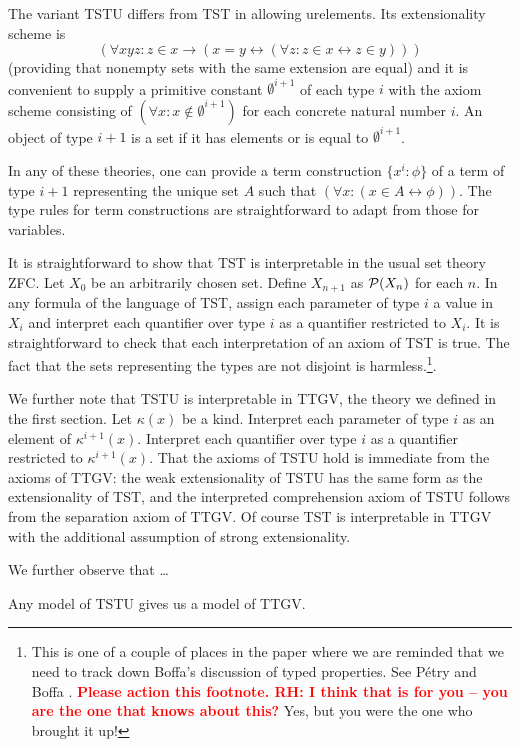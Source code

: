 \documentclass[12pt]{article}
\begin{document}
The variant TSTU differs from TST in allowing urelements.  Its extensionality scheme is $$(\forall xyz:z\in x \rightarrow(x=y \leftrightarrow (\forall z:z\in x \leftrightarrow z \in y)))$$ (providing that nonempty sets with the same extension are equal) and it is convenient to supply a primitive constant $\emptyset^{i+1}$ of each type $i$ with the axiom scheme consisting of $(\forall x:x \not\in \emptyset^{i+1})$ for each concrete natural number $i$.  An object of type $i+1$ is a set if it has elements or is equal to $\emptyset^{i+1}$.

In any of these theories, one can provide a term construction $\{x^i:\phi\}$ of a term of type $i+1$ representing the unique set $A$ such that $(\forall x:(x \in A \leftrightarrow \phi))$. The type rules for term constructions are straightforward to adapt from those for variables.

It is straightforward to show that TST is interpretable in the usual set theory ZFC.  Let $X_0$ be an arbitrarily chosen set. Define $X_{n+1}$ as ${\cal P}(X_n)$ for each $n$.  In any formula of the language of TST, assign each parameter
of type $i$ a value in $X_i$ and interpret each quantifier over type $i$ as a quantifier restricted to $X_i$.  It is straightforward to check that each interpretation of an axiom of TST is true.   The fact that the sets representing the types are not disjoint is harmless.\footnote{

This is one of a couple of places in the paper where we are reminded that we need to track down Boffa's discussion of typed properties.   See P\'etry \cite{petry1} and Boffa \cite{boffatyped}.  \textcolor{red}{\bf Please action this footnote.  RH:  I think that is for you -- you are the one that knows about this?}
Yes, but you were the one who brought it up!}.

We further note that TSTU is interpretable in TTGV, the theory we defined in the first section.  Let $\kappa(x)$ be a kind.  Interpret each parameter of type $i$ as an element of $\kappa^{i+1}(x)$.  Interpret each quantifier over type $i$ as a quantifier restricted to $\kappa^{i+1}(x)$.  That the axioms of TSTU hold is immediate from the axioms of TTGV:  the weak extensionality of TSTU has the same form as the extensionality of TST, and the interpreted comprehension axiom of TSTU follows from
the separation axiom of TTGV.  Of course TST is interpretable in TTGV with the additional assumption of strong extensionality.

We further observe that \ldots
\begin{thm}
  Any model of TSTU gives us a model of TTGV.\end{thm}
\end{document}
